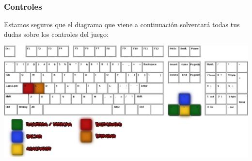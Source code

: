 \subsubsection{Controles}
Estamos seguros que el diagrama que viene a continuación solventará todas tus dudas sobre los controles del juego:

\begin{center}
	\includegraphics[scale=0.35]{controles.png}
\end{center}
